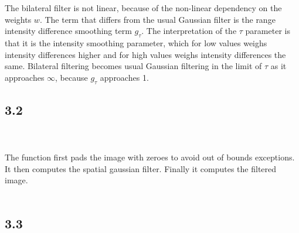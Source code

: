 \documentclass[11pt]{report}
\begin{document}
The bilateral filter is not linear, because of the non-linear dependency on the weights $w$. The term that differs from the usual Gaussian filter is the range intensity difference smoothing term $g_\tau$. The interpretation of the $\tau$ parameter is that it is the intensity smoothing parameter, which for low values weighs intensity differences higher and for high values weighs intensity differences the same. Bilateral filtering becomes usual Gaussian filtering in the limit of $\tau$ as it approaches $\infty$, because $g_\tau$ approaches 1.

\subsection{3.2}

\\
\\
The function first pads the image with zeroes to avoid out of bounds exceptions. It then computes the spatial gaussian filter. Finally it computes the filtered image.\\
\\
\subsection{3.3}
\end{document}
